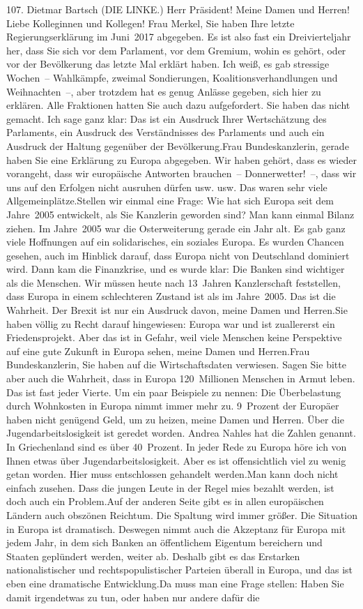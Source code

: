 \documentclass{article}
\begin{document}
	107. Dietmar Bartsch (DIE LINKE.) Herr Präsident! Meine Damen und Herren! Liebe Kolleginnen und Kollegen! Frau Merkel, Sie haben Ihre letzte Regierungserklärung im Juni 2017 abgegeben. Es ist also fast ein Dreivierteljahr her, dass Sie sich vor dem Parlament, vor dem Gremium, wohin es gehört, oder vor der Bevölkerung das letzte Mal erklärt haben. Ich weiß, es gab stressige Wochen – Wahlkämpfe, zweimal Sondierungen, Koalitionsverhandlungen und Weihnachten –, aber trotzdem hat es genug Anlässe gegeben, sich hier zu erklären. Alle Fraktionen hatten Sie auch dazu aufgefordert. Sie haben das nicht gemacht. Ich sage ganz klar: Das ist ein Ausdruck Ihrer Wertschätzung des Parlaments, ein Ausdruck des Verständnisses des Parlaments und auch ein Ausdruck der Haltung gegenüber der Bevölkerung.Frau Bundeskanzlerin, gerade haben Sie eine Erklärung zu Europa abgegeben. Wir haben gehört, dass es wieder vorangeht, dass wir europäische Antworten brauchen – Donnerwetter! –, dass wir uns auf den Erfolgen nicht ausruhen dürfen usw. usw. Das waren sehr viele Allgemeinplätze.Stellen wir einmal eine Frage: Wie hat sich Europa seit dem Jahre 2005 entwickelt, als Sie Kanzlerin geworden sind? Man kann einmal Bilanz ziehen. Im Jahre 2005 war die Osterweiterung gerade ein Jahr alt. Es gab ganz viele Hoffnungen auf ein solidarisches, ein soziales Europa. Es wurden Chancen gesehen, auch im Hinblick darauf, dass Europa nicht von Deutschland dominiert wird. Dann kam die Finanzkrise, und es wurde klar: Die Banken sind wichtiger als die Menschen. Wir müssen heute nach 13 Jahren Kanzlerschaft feststellen, dass Europa in einem schlechteren Zustand ist als im Jahre 2005. Das ist die Wahrheit. Der Brexit ist nur ein Ausdruck davon, meine Damen und Herren.Sie haben völlig zu Recht darauf hingewiesen: Europa war und ist zuallererst ein Friedensprojekt. Aber das ist in Gefahr, weil viele Menschen keine Perspektive auf eine gute Zukunft in Europa sehen, meine Damen und Herren.Frau Bundeskanzlerin, Sie haben auf die Wirtschaftsdaten verwiesen. Sagen Sie bitte aber auch die Wahrheit, dass in Europa 120 Millionen Menschen in Armut leben. Das ist fast jeder Vierte. Um ein paar Beispiele zu nennen: Die Überbelastung durch Wohnkosten in Europa nimmt immer mehr zu. 9 Prozent der Europäer haben nicht genügend Geld, um zu heizen, meine Damen und Herren. Über die Jugendarbeitslosigkeit ist geredet worden. Andrea Nahles hat die Zahlen genannt. In Griechenland sind es über 40 Prozent. In jeder Rede zu Europa höre ich von Ihnen etwas über Jugendarbeitslosigkeit. Aber es ist offensichtlich viel zu wenig getan worden. Hier muss entschlossen gehandelt werden.Man kann doch nicht einfach zusehen. Dass die jungen Leute in der Regel mies bezahlt werden, ist doch auch ein Problem.Auf der anderen Seite gibt es in allen europäischen Ländern auch obszönen Reichtum. Die Spaltung wird immer größer. Die Situation in Europa ist dramatisch. Deswegen nimmt auch die Akzeptanz für Europa mit jedem Jahr, in dem sich Banken an öffentlichem Eigentum bereichern und Staaten geplündert werden, weiter ab. Deshalb gibt es das Erstarken nationalistischer und rechtspopulistischer Parteien überall in Europa, und das ist eben eine dramatische Entwicklung.Da muss man eine Frage stellen: Haben Sie damit irgendetwas zu tun, oder haben nur andere dafür die 
\end{document}
